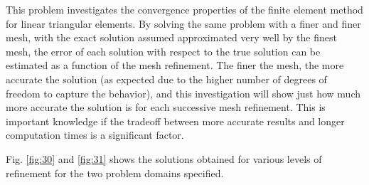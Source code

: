 \documentclass[10pt]{article}
\begin{document}
This problem investigates the convergence properties of the finite element method for linear triangular elements. By solving the same problem with a finer and finer mesh, with the exact solution assumed approximated very well by the finest mesh, the error of each solution with respect to the true solution can be estimated as a function of the mesh refinement. The finer the mesh, the more accurate the solution (as expected due to the higher number of degrees of freedom to capture the behavior), and this investigation will show just how much more accurate the solution is for each successive mesh refinement. This is important knowledge if the tradeoff between more accurate results and longer computation times is a significant factor. 

Fig. \ref{fig:30} and \ref{fig:31} shows the solutions obtained for various levels of refinement for the two problem domains specified. 
\end{document}
